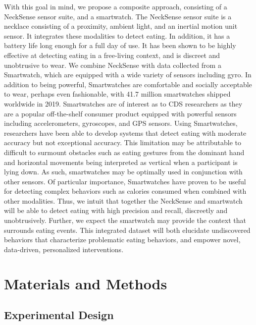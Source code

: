 \documentclass[conference]{IEEEtran}
\begin{document}
With this goal in mind, we propose a composite approach, consisting of a NeckSense sensor suite, and a smartwatch. The NeckSense sensor suite is a necklace consisting of a proximity, ambient light, and an inertial motion unit sensor. It integrates these modalities to detect eating. In addition, it has a battery life long enough for a full day of use\cite{Zhang2019-lq}. It has been shown to be highly effective at detecting eating in a free-living context, and is discreet and unobtrusive to wear\cite{Zhang2019-lq}. We combine NeckSense with data collected from a Smartwatch, which are equipped with a wide variety of sensors including gyro. In addition to being powerful, Smartwatches are comfortable and socially acceptable to wear, perhaps even fashionable, with 41.7 million smartwatches shipped worldwide in 2019\cite{noauthor_undated-pz,Choi2016-fv}. Smartwatches are of interest as to CDS researchers as they are a popular off-the-shelf consumer product equipped with powerful sensors including accelerometers, gyroscopes, and GPS sensors\cite{Johnston2015-hu,Su2016-eg}. Using Smartwatches, researchers have been able to develop systems that detect eating with moderate accuracy but not exceptional accuracy\cite{Zhang2017-xc}. This limitation may be attributable to difficult to surmount obstacles such as eating gestures from the dominant hand and horizontal movements being interpreted as vertical when a participant is lying down\cite{Zhang2017-xc}. As such, smartwatches may be optimally used in conjunction with other sensors. Of particular importance, Smartwatches have proven to be useful for detecting complex behaviors such as calories consumed when combined with other modalities\cite{Shoaib2015-br,Dong2012-fh}. Thus, we intuit that together the NeckSense and smartwatch will be able to detect eating with high precision and recall, discreetly and unobtrusively. Further, we expect the smartwatch may provide the context that surrounds eating events. This integrated dataset will both elucidate undiscovered behaviors that characterize problematic eating behaviors, and empower novel, data-driven, personalized interventions.
 

\section{Materials and Methods}

\subsection{Experimental Design}
\end{document}

